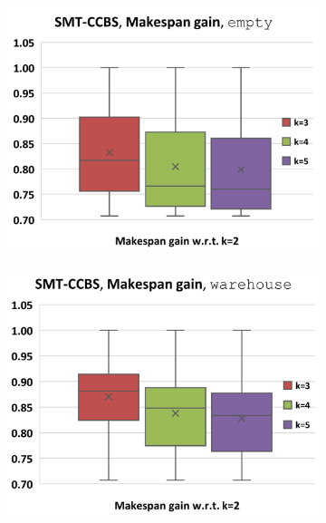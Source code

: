 \documentclass[review]{elsarticle}
\begin{document}
\begin{figure}[t]
\centering
    \begin{subfigure}
        \centering
        \includegraphics[width=0.45\linewidth]{mapfr-Makespan-plot-smtcbs-empty.pdf}
    \end{subfigure}\hspace{0.025\linewidth}%
    \begin{subfigure}
        \centering
        \includegraphics[width=0.45\linewidth]{mapfr-Makespan-plot-smtcbs-warehouse.pdf}
    \end{subfigure}%
    

\end{figure}
\end{document}
